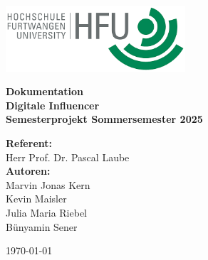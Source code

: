 \documentclass[a4paper,12pt]{article}
\begin{document}
\begin{titlepage}
    \centering
    \begin{flushright}
        \includegraphics[width=0.5\textwidth]{images/HFU-Logo.png}
    \end{flushright}
    
    \vspace{4cm}
    
    {\Large \textbf{Dokumentation}}\\[0.5cm]
    {\huge \textbf{Digitale Influencer}}\\[1.5cm]
    
    \textbf{Semesterprojekt Sommersemester 2025}
    
    \vfill
    
    \begin{flushleft}
    \textbf{Referent:} \\
    Herr Prof. Dr. Pascal Laube\\[2.5cm]
    
    \textbf{Autoren:} \\
    Marvin Jonas Kern \\
    Kevin Maisler \\
    Julia Maria Riebel \\
    Bünyamin Sener \\
    \end{flushleft}
    
    \vfill
    \begin{center}
        {\large \today}
    \end{center}
\end{titlepage}

\renewcommand*\contentsname{Inhaltsverzeichnis}
\tableofcontents
\newpage
\end{document}
